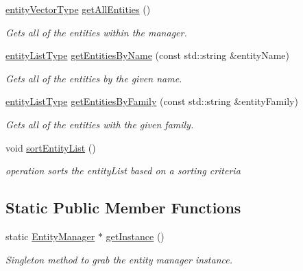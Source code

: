 \begin{DoxyCompactItemize}
\hyperlink{_entity_manager_8h_ac6eefa7a2a0560298c06e549b535f58f}{entity\-Vector\-Type} \hyperlink{class_entity_manager_a452113e422a9c501bb008761f7609e33}{get\-All\-Entities} ()
\begin{DoxyCompactList}\small\item\em Gets all of the entities within the manager. \end{DoxyCompactList}\item 
\hyperlink{_entity_manager_8h_ad498cce7240e0ba6c86bd9acaa5ba2ff}{entity\-List\-Type} \hyperlink{class_entity_manager_aa7e75a5cec1e2f2f3584bd2780722fe4}{get\-Entities\-By\-Name} (const std\-::string \&entity\-Name)
\begin{DoxyCompactList}\small\item\em Gets all of the entities by the given name. \end{DoxyCompactList}\item 
\hyperlink{_entity_manager_8h_ad498cce7240e0ba6c86bd9acaa5ba2ff}{entity\-List\-Type} \hyperlink{class_entity_manager_ab9d4afacf0e0720d7c53eff351dd358e}{get\-Entities\-By\-Family} (const std\-::string \&entity\-Family)
\begin{DoxyCompactList}\small\item\em Gets all of the entities with the given family. \end{DoxyCompactList}\item 
void \hyperlink{class_entity_manager_ae75aae1a46961a44a450a79add5e8921}{sort\-Entity\-List} ()
\begin{DoxyCompactList}\small\item\em operation sorts the entity\-List based on a sorting criteria \end{DoxyCompactList}\end{DoxyCompactItemize}
\subsection*{Static Public Member Functions}
\begin{DoxyCompactItemize}
\item 
static \hyperlink{class_entity_manager}{Entity\-Manager} $\ast$ \hyperlink{class_entity_manager_a65ec69ca7631238bfb45c65de80a26b1}{get\-Instance} ()
\begin{DoxyCompactList}\small\item\em Singleton method to grab the entity manager instance. \end{DoxyCompactList}\end{DoxyCompactItemize}


